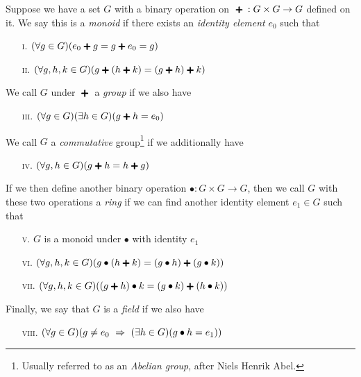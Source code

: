 \begin{definition}
    Suppose we have a set $G$ with a binary operation on $\Plus: G \times G \to G$ defined on it.
    We say this is a \emph{monoid} if there exists an \emph{identity element} $e_0$
    such that
    \begin{enumerate}
        \item[\textsc{i.}]
            $\pn*{\forall g \in G}\pn*{e_0 \Plus g = g \Plus e_0 = g}$
        \item[\textsc{ii.}]
            $\pn*{\forall g, h, k \in G}\pn*{g \Plus \pn*{h \Plus k} = \pn*{g \Plus h} \Plus k}$
    \end{enumerate}
    We call $G$ under $\Plus$ a \emph{group} if we also have
    \begin{enumerate}
        \item[\textsc{iii.}]
            $\pn*{\forall g \in G}\pn*{\exists h \in G}\pn*{g \Plus h = e_0}$
    \end{enumerate}
    We call $G$ a \emph{commutative} group\footnote{Usually referred to as an \emph{Abelian group}, after Niels Henrik Abel.} if we additionally have
    \begin{enumerate}
        \item[\textsc{iv.}]
            $\pn*{\forall g, h \in G}\pn*{g \Plus h = h \Plus g}$
    \end{enumerate}
    If we then define another binary operation $\bullet: G \times G \to G$,
    then we call $G$ with these two operations a \emph{ring}
    if we can find another identity element $e_1 \in G$ such that
    \begin{enumerate}
        \item[\textsc{v.}]
            $G$ is a monoid under $\bullet$ with identity $e_1$
        \item[\textsc{vi.}]
            $\pn*{\forall g, h, k \in G}\pn*{g \bullet \pn*{h \Plus k} = \pn*{g \bullet h} \Plus \pn*{g \bullet k}}$
        \item[\textsc{vii.}]
            $\pn*{\forall g, h, k \in G}\pn*{\pn*{g \Plus h} \bullet k = \pn*{g \bullet k} \Plus \pn*{h \bullet k}}$
    \end{enumerate}
    Finally, we say that $G$ is a \emph{field} if we also have
    \begin{enumerate}
        \item[\textsc{viii.}]
            $\pn*{\forall g \in G}\pn*{g \neq e_0 \implies \pn*{\exists h \in G}\pn*{g \bullet h = e_1}}$
    \end{enumerate}
\end{definition}


